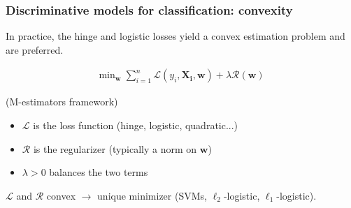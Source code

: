 \begin{frame}
\frametitle{Discriminative models for classification: convexity}

In practice, the hinge and logistic losses yield a convex estimation
problem and are preferred.

\begin{align*}
\text{min}_{\mathbf{w}} \; \sum_{i=1}^n \mathcal{L}(y_i,\mathbf{X_i},\mathbf{w}) + \lambda \mathcal{R} (\mathbf{w})
\end{align*}


(M-estimators framework)
\begin{itemize}
\item $\mathcal{L}$ is the loss function (hinge, logistic, quadratic...)
\item $\mathcal{R}$ is the regularizer (typically a norm on $\mathbf{w}$)
\item $\lambda > 0$ balances the two terms
\end{itemize}
$\mathcal{L}$ and $\mathcal{R}$ convex $\rightarrow$ unique minimizer (SVMs, $\ell_2$-logistic, $\ell_1$-logistic).
\end{frame}


